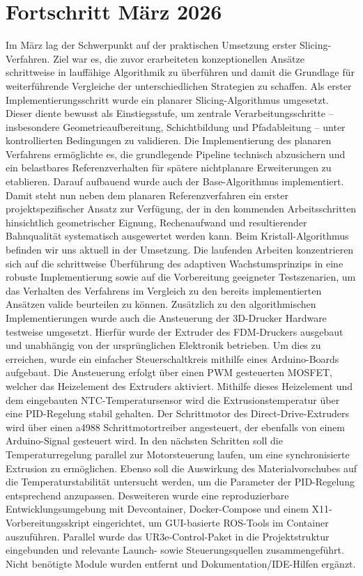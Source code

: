 \documentclass[
	paper=a4,
	fontsize=11pt,
	parskip=half,
	headings=normal,
	bibliography=totoc,
	listof=totoc
]{scrartcl}
\begin{document}
\section{Fortschritt März 2026}
	Im März lag der Schwerpunkt auf der praktischen Umsetzung erster Slicing-Verfahren.
	Ziel war es, die zuvor erarbeiteten konzeptionellen Ansätze schrittweise in lauffähige Algorithmik zu überführen und damit die Grundlage für weiterführende Vergleiche der unterschiedlichen Strategien zu schaffen.
	Als erster Implementierungsschritt wurde ein planarer Slicing-Algorithmus umgesetzt.
	Dieser diente bewusst als Einstiegsstufe, um zentrale Verarbeitungsschritte -- insbesondere Geometrieaufbereitung, Schichtbildung und Pfadableitung -- unter kontrollierten Bedingungen zu validieren.
	Die Implementierung des planaren Verfahrens ermöglichte es, die grundlegende Pipeline technisch abzusichern und ein belastbares Referenzverhalten für spätere nichtplanare Erweiterungen zu etablieren.
	Darauf aufbauend wurde auch der Base-Algorithmus implementiert.
	Damit steht nun neben dem planaren Referenzverfahren ein erster projektspezifischer Ansatz zur Verfügung, der in den kommenden Arbeitsschritten hinsichtlich geometrischer Eignung, Rechenaufwand und resultierender Bahnqualität systematisch ausgewertet werden kann.
	Beim Kristall-Algorithmus befinden wir uns aktuell in der Umsetzung.
	Die laufenden Arbeiten konzentrieren sich auf die schrittweise Überführung des adaptiven Wachstumsprinzips in eine robuste Implementierung sowie auf die Vorbereitung geeigneter Testszenarien, um das Verhalten des Verfahrens im Vergleich zu den bereits implementierten Ansätzen valide beurteilen zu können.
	\newline
	Zusätzlich zu den algorithmischen Implementierungen wurde auch die Ansteuerung der 3D-Drucker Hardware testweise umgesetzt.
	Hierfür wurde der Extruder des FDM-Druckers ausgebaut und unabhängig von der ursprünglichen Elektronik betrieben.
	Um dies zu erreichen, wurde ein einfacher Steuerschaltkreis mithilfe eines Arduino-Boards aufgebaut.
	Die Ansteuerung erfolgt über einen PWM gesteuerten MOSFET, welcher das Heizelement des Extruders aktiviert.
	Mithilfe dieses Heizelement und dem eingebauten NTC-Temperatursensor wird die Extrusionstemperatur über eine PID-Regelung stabil gehalten.
	Der Schrittmotor des Direct-Drive-Extruders wird über einen a4988 Schrittmotortreiber angesteuert, der ebenfalls von einem Arduino-Signal gesteuert wird.
	In den nächsten Schritten soll die Temperaturregelung parallel zur Motorsteuerung laufen, um eine synchronisierte Extrusion zu ermöglichen.
	Ebenso soll die Auswirkung des Materialvorschubes auf die Temperaturstabilität untersucht werden, um die Parameter der PID-Regelung entsprechend anzupassen.
	\newline
	Desweiteren wurde eine reproduzierbare Entwicklungsumgebung mit Devcontainer, Docker-Compose und einem X11-Vorbereitungsskript eingerichtet, um GUI-basierte ROS-Tools im Container auszuführen.
	Parallel wurde das UR3e-Control-Paket in die Projektstruktur eingebunden und relevante Launch- sowie Steuerungsquellen zusammengeführt.
	Nicht benötigte Module wurden entfernt und Dokumentation/IDE-Hilfen ergänzt.
\end{document}
